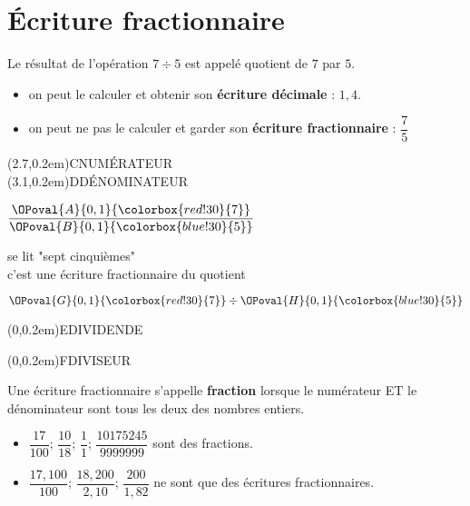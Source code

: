 \section{Écriture fractionnaire}
Le résultat de l'opération $7\div 5$ est appelé quotient de $7$ par $5$.\vspace*{-7mm}
\begin{remarques}
    \begin{itemize}
        \item on peut le calculer et obtenir son {\bfseries écriture décimale} : $1,4$.
        \item on peut ne pas le calculer et garder son {\bfseries écriture fractionnaire} : $\dfrac{7}{5}$
    \end{itemize}
\end{remarques}
\vspace*{-15mm}
\begin{minipage}[c]{0.2\linewidth}
	\pnode(2.7,0.2em){C}{\colorbox{red!30}{NUMÉRATEUR}}\\	
	\pnode(3.1,0.2em){D}{\colorbox{blue!30}{DÉNOMINATEUR}}
\end{minipage}
$\dfrac{\OPoval{A}{0,1}{\colorbox{red!30}{7}}}{\OPoval{B}{0,1}{\colorbox{blue!30}{5}}}$\qquad
{}
\begin{minipage}[c]{0.4\linewidth}
se lit "sept cinquièmes"\\
c'est une écriture fractionnaire du quotient
\end{minipage}
$\OPoval{G}{0,1}{\colorbox{red!30}{7}} \div \OPoval{H}{0,1}{\colorbox{blue!30}{5}}$\qquad
\begin{minipage}[c]{0.3\linewidth}
	\pnode(0,0.2em){E}{\colorbox{red!30}{DIVIDENDE}}
	\par\vspace{2.5cm}
	\pnode(0,0.2em){F}{\colorbox{blue!30}{DIVISEUR}}
\end{minipage}
\vspace*{-10mm}
\begin{definition}
    Une écriture fractionnaire s'appelle {\bfseries fraction} lorsque le numérateur ET le dénominateur sont tous les deux des nombres entiers.
\end{definition}

\begin{exemples*1}
    \vspace*{2mm}
    \begin{itemize}
        \item $\dfrac{17}{100}$; $\dfrac{10}{18}$; $\dfrac{1}{1}$; $\dfrac{10175245}{9999999}$ sont des fractions. \vspace*{2mm}
        \item $\dfrac{17,100}{100}$; $\dfrac{18,200}{2,10}$; $\dfrac{200}{1,82}$ ne sont que des écritures fractionnaires.
    \end{itemize}
\end{exemples*1}

